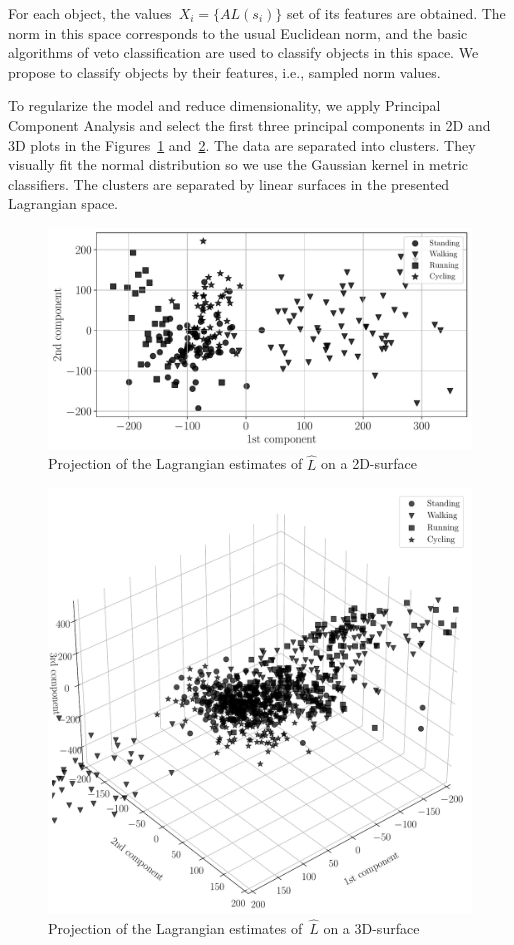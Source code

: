 \documentclass[sn-mathphys-num]{sn-jnl}
\theoremstyle{thmstylethree}
\theoremstyle{thmstyletwo}
\theoremstyle{thmstyleone}
\begin{document}
For each object, the values~$X_i = \{AL(s_i)\}$ set of its features are obtained. The norm in this space corresponds to the usual Euclidean norm, and the basic algorithms of veto classification are used to classify objects in this space. We propose to classify objects by their features, i.e.,
sampled norm values.

To regularize the model and reduce dimensionality, we apply Principal Component Analysis and select the first three principal components in 2D and 3D plots in the Figures~\ref{fig:2D} and~\ref{fig:3D}. 
The data are separated into clusters. They visually fit the normal distribution so we use the Gaussian kernel in metric classifiers. The clusters are separated by linear surfaces in the presented Lagrangian space. 

\begin{figure}[!htbp]
\centering\includegraphics[scale = 0.5]{Data.pdf}
\caption{Projection of the Lagrangian estimates of $\hat{L}$ on a 2D-surface}
\label{fig:2D}
\end{figure}

\begin{figure}[!htbp]
\centering\includegraphics[scale = 0.4]{Data_3D.pdf}
\caption{Projection of the Lagrangian estimates of~$\hat{L}$ on a 3D-surface}
\label{fig:3D}
\end{figure}
\end{document}
